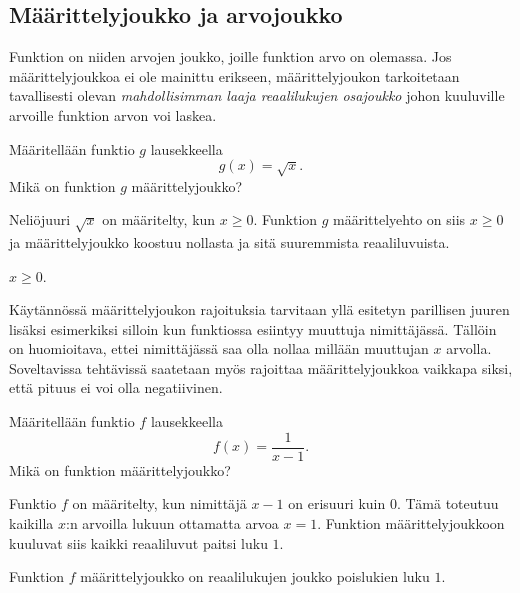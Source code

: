 \subsection*{Määrittelyjoukko ja arvojoukko}


Funktion  on niiden arvojen joukko, joille funktion arvo on olemassa. Jos määrittelyjoukkoa ei ole mainittu erikseen, määrittelyjoukon tarkoitetaan tavallisesti olevan \textit{mahdollisimman laaja reaalilukujen osajoukko} johon kuuluville arvoille funktion arvon voi laskea. %

\begin{esimerkki}
	 Määritellään funktio $g$ lausekkeella \[ g(x) = \sqrt{x}. \]
	 Mikä on funktion $g$ määrittelyjoukko?
	 \begin{esimratk}
		Neliöjuuri $\sqrt{x}$ on määritelty, kun $x\geq{0}$. Funktion $g$ määrittelyehto on siis $x\geq{0}$ ja määrittelyjoukko koostuu nollasta ja sitä suuremmista reaaliluvuista.
	 \end{esimratk}
	 \begin{esimvast}
	  $x\geq{0}$.
	 \end{esimvast}
\end{esimerkki}

Käytännössä määrittelyjoukon rajoituksia tarvitaan yllä esitetyn parillisen juuren lisäksi esimerkiksi silloin kun funktiossa esiintyy muuttuja nimittäjässä.
Tällöin on huomioitava, ettei nimittäjässä saa olla nollaa millään muuttujan $x$ arvolla. 
Soveltavissa tehtävissä saatetaan myös rajoittaa määrittelyjoukkoa vaikkapa siksi, että pituus ei voi olla negatiivinen.

\begin{esimerkki}
	Määritellään funktio $f$ lausekkeella \[ f(x) = \frac{1}{x-1}. \]
	Mikä on funktion määrittelyjoukko?
	\begin{esimratk}
		Funktio $f$ on määritelty, kun nimittäjä $x-1$ on erisuuri kuin 0.
		Tämä toteutuu kaikilla $x$:n arvoilla lukuun ottamatta arvoa $x = 1$.
		Funktion määrittelyjoukkoon kuuluvat siis kaikki reaaliluvut paitsi luku $1$.
	\end{esimratk}
	\begin{esimvast}
		Funktion $f$ määrittelyjoukko on reaalilukujen joukko poislukien luku $1$.
	\end{esimvast}
\end{esimerkki}


